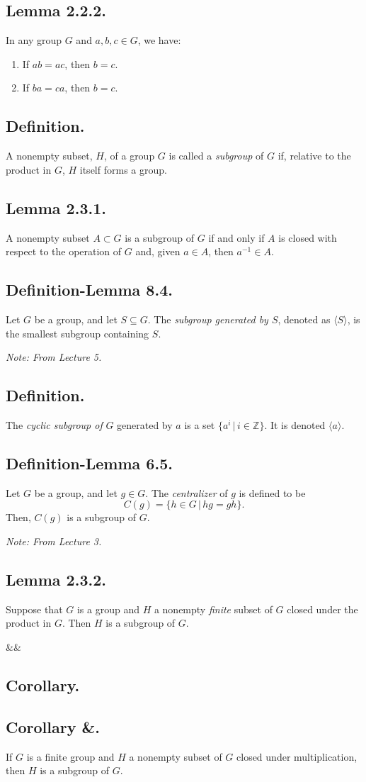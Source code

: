 \documentclass{article}
\newenvironment{lemma}[1]{\subsection*{Lemma #1.}}{}
\newenvironment{defn}{\subsection*{Definition.}}{}
\newenvironment{defnlemma}[1]{\subsection*{Definition-Lemma #1.}}{}
\newenvironment{corollary}[1]{
    \def\temp{#1}\def\null{&}\ifx\temp\null
        \subsection*{Corollary.}
    \else
        \subsection*{Corollary #1.}
    \fi
    
}{}
\newcommand*{\Z}{\mathbb{Z}}
\begin{document}
\begin{lemma}{2.2.2}
    In any group $G$ and $a, b, c \in G$, we have:
    \begin{enumerate}[label=(\alph*)]
        \item If $ab = ac$, then $b = c$.
        \item If $ba = ca$, then $b = c$.
    \end{enumerate}
\end{lemma}

\begin{defn}
    A nonempty subset, $H$, of a group $G$ is called a \textit{subgroup} of $G$ if,
    relative to the product in $G$, $H$ itself forms a group.
\end{defn}

\begin{lemma}{2.3.1}
    A nonempty subset $A \subset G$ is a subgroup of $G$ if and only if $A$ is closed 
    with respect to the operation of $G$ and, given $a \in A$, then $a^{-1} \in A$.
\end{lemma}

\begin{defnlemma}{8.4}
    Let $G$ be a group, and let $S \subseteq G$.
    The \textit{subgroup generated by $S$}, denoted as $\langle S \rangle $, is the smallest subgroup containing $S$.

    \textit{Note: From Lecture 5.}
\end{defnlemma}

\begin{defn}
    The \textit{cyclic subgroup of} $G$ generated by $a$ is a set $\{a^i \, | \, i \in \Z\}$.
    It is denoted $\langle a \rangle$.
\end{defn}

\begin{defnlemma}{6.5}
    Let $G$ be a group, and let $g \in G$. The \textit{centralizer} of $g$ is defined to be
    \[
        C(g) = \{h \in G \, | \, hg = gh\}.  
    \]
    Then, $C(g)$ is a subgroup of $G$.

    \textit{Note: From Lecture 3.}
\end{defnlemma}

\begin{lemma}{2.3.2}
    Suppose that $G$ is a group and $H$ a nonempty \textit{finite} subset of $G$ closed under the product in $G$.
    Then $H$ is a subgroup of $G$.
\end{lemma}

\begin{corollary}{&}
    If $G$ is a finite group and $H$ a nonempty subset of $G$ closed under multiplication, then $H$ is a subgroup of $G$.
\end{corollary}
\end{document}
